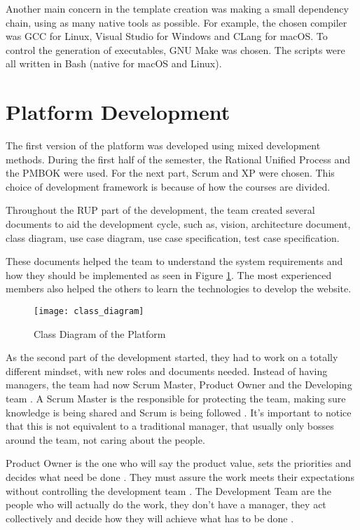 Another main concern in the template creation was making a small dependency chain, using as many native tools as possible. For example, the chosen compiler was GCC for Linux, Visual Studio for Windows and CLang for macOS. To control the generation of executables, GNU Make was chosen. The scripts were all written in Bash (native for macOS and Linux).


\section{Platform Development}
\label{sec:platform_development}

The first version of the platform was developed using mixed development methods. During the first half of the semester, the Rational Unified Process  and the PMBOK were used. For the next part, Scrum and XP were chosen. This choice of development framework is because of how the courses are divided.

Throughout the RUP part of the development, the team created several documents to aid the development cycle, such as, vision, architecture document, class diagram, use case diagram, use case specification, test case specification.

These documents helped the team to understand the system requirements and how they should be implemented as seen in Figure \ref{fig:class_diagram}. The most experienced members also helped the others to learn the technologies to develop the website.


\begin{figure}[h!]
\centering
\texttt{[image: class\_diagram]}
\caption{Class Diagram of the Platform \cite{plataforma2017arquitetura}}
\label{fig:class_diagram}
\end{figure}

As the second part of the development started, they had to work on a totally different mindset, with new roles and documents needed. Instead of having managers, the team had now Scrum Master, Product Owner and the Developing team \cite{agile422017}. A Scrum Master is the responsible for protecting the team, making sure knowledge is being shared and Scrum is being followed \cite{scrumalliance2017}. It's important to notice that this is not equivalent to a traditional manager, that usually only bosses around the team, not caring about the people.

Product Owner is the one who will say the product value, sets the priorities and decides what need be done \cite{agile422017}. They must assure the work meets their expectations without controlling the development team \cite{scrumalliance2017}. The Development Team are the people who will actually do the work, they don't have a manager, they act collectively and decide how they will achieve what has to be done \cite{scrumalliance2017}.

